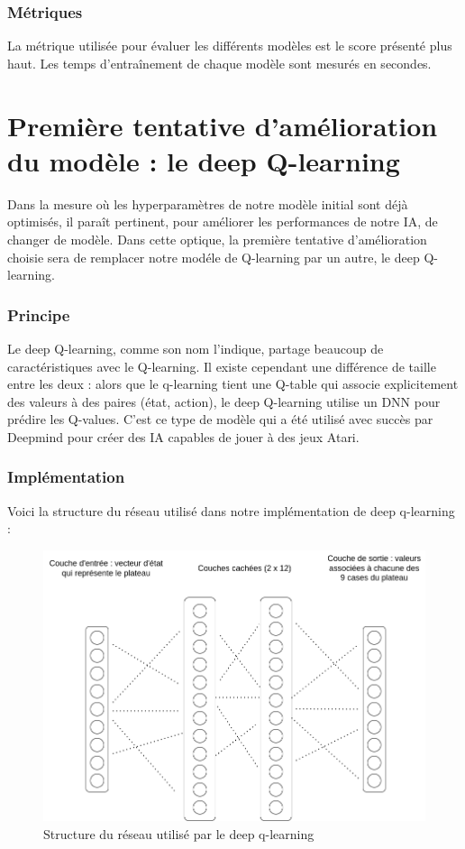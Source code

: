 \documentclass[french]{article}
\begin{document}
    \subsubsection{Métriques}

    La métrique utilisée pour évaluer les différents modèles est le score présenté plus haut. Les temps d'entraînement de chaque modèle sont mesurés en secondes. 

    \section{Première tentative d'amélioration du modèle : le deep Q-learning}

    Dans la mesure où les hyperparamètres de notre modèle initial sont déjà optimisés, il paraît pertinent, pour améliorer les performances de notre IA, de changer de modèle. Dans cette optique, la première tentative d'amélioration choisie sera de remplacer notre modéle de Q-learning par un autre, le deep Q-learning.
    \subsubsection{Principe}

    Le deep Q-learning, comme son nom l'indique, partage beaucoup de caractéristiques avec le Q-learning. Il existe cependant une différence de taille entre les deux : alors que le q-learning tient une Q-table qui associe explicitement des valeurs à des paires (état, action), le deep Q-learning utilise un DNN pour prédire les Q-values. C'est ce type de modèle qui a été utilisé avec succès par Deepmind pour créer des IA capables de jouer à des jeux Atari.


    \subsubsection{Implémentation}
    Voici la structure du réseau utilisé dans notre implémentation de deep q-learning :
    \begin{figure}[h]
        \includegraphics[width=13cm]{structure_dnn}
        \centering
        \caption{Structure du réseau utilisé par le deep q-learning}
        \centering
    \end{figure}
\end{document}
